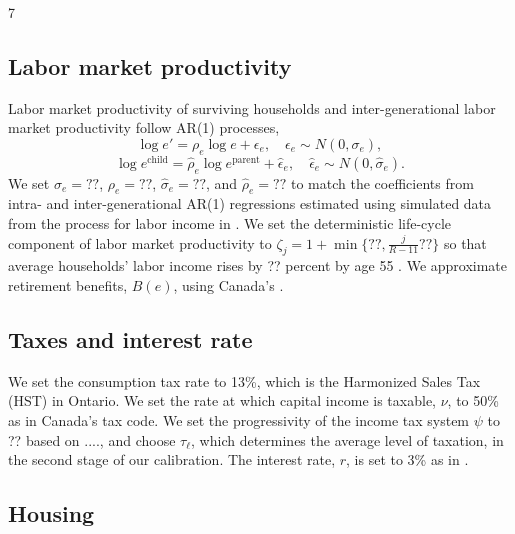 7\documentclass[parskip=full]{article}
\begin{document}
\subsection{Labor market productivity}
Labor market productivity of surviving households and inter-generational labor market productivity follow AR(1) processes,
\begin{equation*}
  \log e' = \rho_{e} \log e + \epsilon_{e},\quad \epsilon_{e}\sim N(0,\sigma_{e}),
\end{equation*}
\begin{equation*}
\log e^{\text{child}} = \hat{\rho}_{e} \log e^{\text{parent}} + \hat{\epsilon}_{e},\quad \hat{\epsilon}_{e}\sim N(0,\hat{\sigma}_{e}).
\end{equation*}
We set $\sigma_{e}=??$, $\rho_{e}=??$, $\hat{\sigma}_{e}=??$, and $\hat{\rho}_{e}=??$ to match the coefficients from intra- and inter-generational AR(1) regressions estimated using simulated data from the process for labor income in \citet{gkkoc}. We set the deterministic life-cycle component of labor market productivity to $\zeta_j =1+\min\{??,\frac{j}{R-11}??\}$ so that average households' labor income rises by ?? percent by age 55 \citep{guvenen-et-al}. We approximate retirement benefits, $B(e)$, using Canada's \citet{pspp}.

\subsection{Taxes and interest rate}
We set the consumption tax rate to 13\%, which is the Harmonized Sales Tax (HST) in Ontario. We set the rate at which capital income is taxable, $
\nu$, to 50\% as in Canada's tax code. We set the progressivity of the income tax system $\psi$ to ?? based on ...., and choose $\tau_{\ell}$, which determines the average level of taxation, in the second stage of our calibration. The interest rate, $r$, is set to 3\% as in \citet{kaplanetal-2019}. 

\subsection{Housing}
\end{document}
